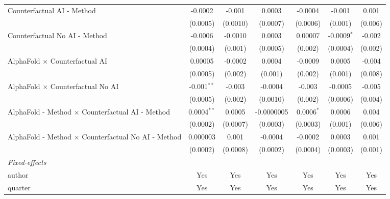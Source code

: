\begin{tabular}{lcccccc}
   Counterfactual AI - Method                                 & -0.0002       & -0.001   & 0.0003       & -0.0004      & -0.001        & 0.001\\   
                                                              & (0.0005)      & (0.0010) & (0.0007)     & (0.0006)     & (0.001)       & (0.006)\\   
   Counterfactual No AI - Method                              & -0.0006       & -0.0010  & 0.0003       & 0.00007      & -0.0009$^{*}$ & -0.002\\   
                                                              & (0.0004)      & (0.001)  & (0.0005)     & (0.002)      & (0.0004)      & (0.002)\\   
   AlphaFold $\times$ Counterfactual AI                       & 0.00005       & -0.0002  & 0.0004       & -0.0009      & 0.0005        & -0.004\\   
                                                              & (0.0005)      & (0.002)  & (0.001)      & (0.002)      & (0.001)       & (0.008)\\   
   AlphaFold $\times$ Counterfactual No AI                    & -0.001$^{**}$ & -0.003   & -0.0004      & -0.003       & -0.0005       & -0.005\\   
                                                              & (0.0005)      & (0.002)  & (0.0010)     & (0.002)      & (0.0006)      & (0.004)\\   
   AlphaFold - Method $\times$ Counterfactual AI - Method     & 0.0004$^{**}$ & 0.0005   & -0.0000005   & 0.0006$^{*}$ & 0.0006        & 0.004\\   
                                                              & (0.0002)      & (0.0007) & (0.0003)     & (0.0003)     & (0.001)       & (0.006)\\   
   AlphaFold - Method $\times$ Counterfactual No AI - Method  & 0.000003      & 0.001    & -0.0004      & -0.0002      & 0.0003        & 0.001\\   
                                                              & (0.0002)      & (0.0008) & (0.0002)     & (0.0004)     & (0.0003)      & (0.001)\\   
   \midrule
   \emph{Fixed-effects}\\
   author                                                     & Yes           & Yes      & Yes          & Yes          & Yes           & Yes\\  
   quarter                                                    & Yes           & Yes      & Yes          & Yes          & Yes           & Yes\\  

\end{tabular}
